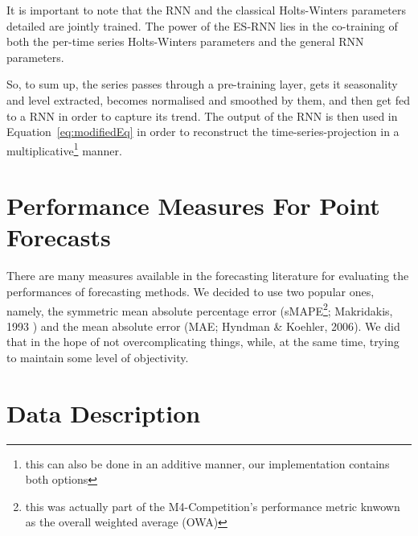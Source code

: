 \documentclass[conference]{IEEEtran}
\begin{document}
It is important to note that the RNN and the classical Holts-Winters parameters detailed are jointly trained. The power of the ES-RNN\cite{es-rnn} lies in the co-training of both the per-time series Holts-Winters parameters and the general RNN parameters.

So, to sum up, the series passes through a pre-training layer, gets it seasonality and level extracted, becomes normalised and smoothed by them, and then get fed to a RNN in order to capture its trend. The output of the RNN is then used in Equation~\ref{eq:modifiedEq} in order to reconstruct the time-series-projection in a multiplicative\footnote{this can also be done in an additive manner, our implementation contains both options} manner.

\section{Performance Measures For Point Forecasts}

There are many measures available in the forecasting literature for evaluating the performances of forecasting methods\cite{mase}. We decided to use two popular ones, namely, the symmetric mean absolute percentage error (sMAPE\footnote{this was actually part of the M4-Competition's performance metric knwown as the overall weighted average (OWA)}; Makridakis, 1993 \cite{smape}) and the mean absolute error (MAE; Hyndman \& Koehler, 2006\cite{mase}). We did that in the hope of not overcomplicating things, while, at the same time, trying to maintain some level of objectivity.

\section{Data Description}
\end{document}
